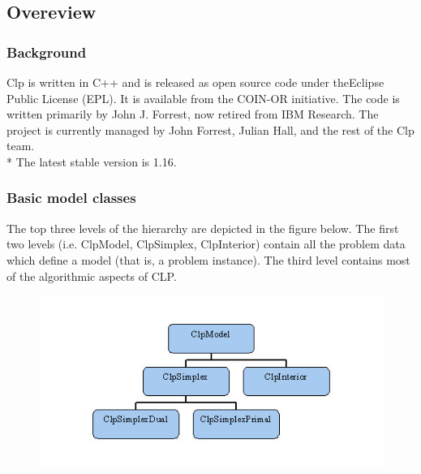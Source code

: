 \documentclass{beamer}
\begin{document}

\subsection{Overeview}

\begin{frame}
\frametitle{Background}
Clp is written in C++ and is released as open source code under the ​Eclipse Public License (EPL). It is available from the ​COIN-OR initiative. The code is written primarily by John J. Forrest, now retired from IBM Research. The project is currently managed by John Forrest, ​Julian Hall, and the rest of the ​Clp team. \\*
The latest stable version is 1.16.
\end{frame}

\begin{frame}
 	\frametitle{Basic model classes}
  The top three levels of the hierarchy are depicted in the figure below. The first two levels (i.e. ClpModel, ClpSimplex, ClpInterior) contain all the problem data which define a model (that is, a problem instance). The third level contains most of the algorithmic aspects of CLP.
  \begin{figure}
  	\includegraphics[width=0.8\linewidth]{clpbasicmodelhier}
  \end{figure}
\end{frame}
\end{document}

